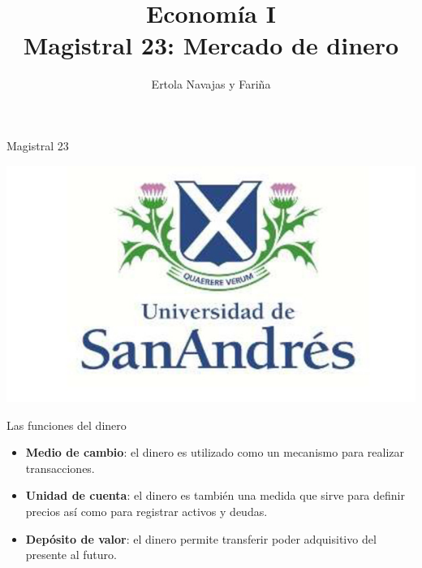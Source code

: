 \documentclass{beamer}
\title[Economía I]{Economía I \vspace{4mm}
\\ Magistral 23: Mercado de dinero}
\date{}
\author[Ertola Navajas y Fariña]{Ertola Navajas y Fariña}
\institute[]{Universidad de San Andrés}
\begin{document}
\begin{frame}
\titlepage
\centering
Magistral 23

\includegraphics[scale=0.2]{Slides Principios de Economia/Figures/logoUDESA.jpg} 
\end{frame}



\begin{frame}{Las funciones del dinero}
    \begin{itemize}
       \item \textbf{Medio de cambio}: el dinero es utilizado como un mecanismo para realizar transacciones. 
  \vspace{1mm}
    \item \textbf{Unidad de cuenta}: el dinero es también una medida que sirve para definir precios así como para registrar activos y deudas.
  \vspace{1mm}  
    \item \textbf{Depósito de valor}: el dinero permite transferir poder adquisitivo del presente al futuro. 
   \end{itemize}
\end{frame}
\end{document}

